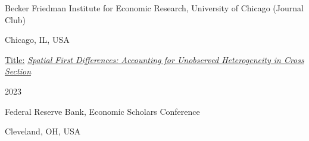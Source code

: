 \vspace{2pt}
\begin{minipage}{.75\linewidth} \begin{flushleft}
      \begin{description}[font=$\bullet$]
      \item{Becker Friedman Institute for Economic Research, University of Chicago (Journal Club)}
      \end{description}
    \end{flushleft} \end{minipage}
\hfill 
\begin{minipage}{.20\linewidth}\begin{flushright}
     Chicago, IL, USA
    \end{flushright}\end{minipage}
 
\begin{minipage}{.75\linewidth} \begin{flushleft}
    \hspace{1cm} \underline{Title:} \href{https://github.com/posmikdc/posmikdc.github.io/blob/master/pdf/RP_Journal_Club__Druckenmiller___Hsiang__2019.pdf}{\textit{Spatial First Differences: Accounting for Unobserved Heterogeneity in Cross Section}}
    \end{flushleft} \end{minipage}
\hfill 
\begin{minipage}{.20\linewidth}\begin{flushright}
     2023
\end{flushright}\end{minipage}

\vspace{2pt}
\begin{minipage}{.75\linewidth} \begin{flushleft}
      \begin{description}[font=$\bullet$]
      \item{Federal Reserve Bank, Economic Scholars Conference}
      \end{description}
    \end{flushleft} \end{minipage}
\hfill 
\begin{minipage}{.20\linewidth}\begin{flushright}
     Cleveland, OH, USA
    \end{flushright}\end{minipage}
 
